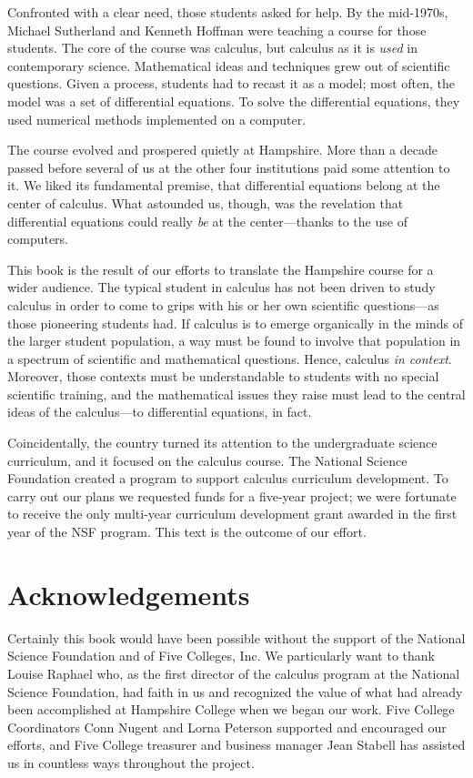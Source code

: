 Confronted with a clear need, those students asked for help.  By the
mid-1970s, Michael Sutherland and Kenneth Hoffman were teaching a
course for those students.  The core of the course was calculus, but
calculus as it is {\em used\/} in contemporary science.  Mathematical
ideas and techniques grew out of scientific questions.  Given a
process, students had to recast it as a model; most often, the model
was a set of differential equations.  To solve the differential
equations, they used numerical methods implemented on a computer.

The course evolved and prospered quietly at Hampshire.  More than a
decade passed before several of us at the other four institutions paid
some attention to it.  We liked its fundamental premise, that
differential equations belong at the center of calculus.  What
astounded us, though, was the revelation that differential equations
could really {\em be\/} at the center---thanks to the use of
computers.

This book is the result of our efforts to translate the Hampshire
course for a wider audience.  The typical student in calculus has not
been driven to study calculus in order to come to grips with his or
her own scientific questions---as those pioneering students had.  If
calculus is to emerge organically in the minds of the larger student
population, a way must be found to involve that population in a
spectrum of scientific and mathematical questions.  Hence, calculus
{\em in context}.  Moreover, those contexts must be understandable to
students with no special scientific training, and the mathematical
issues they raise must lead to the central ideas of the calculus---to
differential equations, in fact.

Coincidentally, the country turned its attention to the undergraduate
science curriculum, and it focused on the calculus course.  The
National Science Foundation created a program to support calculus
curriculum development.  To carry out our plans we requested funds for
a five-year project; we were fortunate to receive the only multi-year
curriculum development grant awarded in the first year of the NSF
program.  This text is the outcome of our effort.


\section*{Acknowledgements}

Certainly this book would have been possible without the support of
the National Science Foundation and of Five Colleges, Inc.  We
particularly want to thank Louise Raphael who, as the first director
of the calculus program at the National Science Foundation, had faith
in us and recognized the value of what had already been accomplished
at Hampshire College when we began our work.  Five College
Coordinators Conn Nugent and Lorna Peterson supported and encouraged
our efforts, and Five College treasurer and business manager Jean
Stabell has assisted us in countless ways throughout the project.

